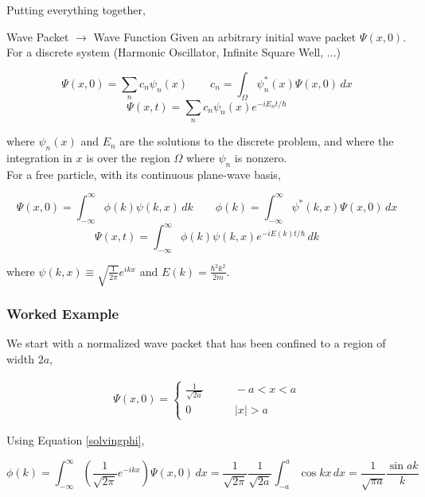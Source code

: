 Putting everything together, 

\begin{mainbox}{Wave Packet $\rightarrow$ Wave Function}
  Given an arbitrary initial wave packet $\Psi(x, 0)$. \\

  For a discrete system (Harmonic Oscillator, Infinite Square Well,  $\hdots$)

   \[
  \Psi(x, 0) = \sum_n c_n \psi_n(x) \qquad c_n = \int_\Omega \psi_n^*(x)\Psi(x,
  0) \, dx
  \] \[ \Psi(x, t) = \sum_n c_n \psi_n(x) e^{-iE_n t/\hbar} \] \vspace{3px}
  
where $\psi_n(x)$ and $E_n$ are the solutions to the discrete problem, and
where the integration in $x$ is over the region $\Omega$ where $\psi_n$ is
nonzero. \\

For a free particle, with its continuous plane-wave basis, 

\[ \Psi(x, 0) = \int_{-\infty}^{\infty} \phi(k)\psi(k, x) \, dk \qquad \phi(k)
= \int_{-\infty}^{\infty} \psi^*(k, x)\Psi(x, 0) \, dx \] \[ \Psi(x, t)
= \int_{-\infty}^{\infty} \phi(k)\psi(k, x) e^{-iE(k) t /\hbar} \, dk \]
\vspace{3px}
  
where $\psi(k, x) \equiv \sqrt{\frac{1}{2\pi}} e^{ikx}$ and $E(k)
= \frac{\hbar^2 k^2}{2m}$.
\end{mainbox}


\subsubsection{Worked Example} 

We start with a normalized wave packet that has been confined to a region of
width $2a$, 

\begin{align} \label{problemfree}
\Psi(x, 0) = \begin{cases}
  \frac{1}{\sqrt{2a}} &\qquad -a < x < a \\ 0 &\qquad |x| > a
\end{cases}
\end{align} \vspace{3px}

Using Equation \ref{solvingphi}, 

\[
  \phi(k) = \int_{-\infty}^{\infty} \left( \frac{1}{\sqrt{2\pi}}e^{-ikx}
  \right) \Psi(x, 0) \, dx = \frac{1}{\sqrt{2\pi}}\frac{1}{\sqrt{2a}}
  \int_{-a}^{a} \cos kx \, dx = \frac{1}{\sqrt{\pi a}} \frac{\sin ak}{k}
\] \vspace{3px}


